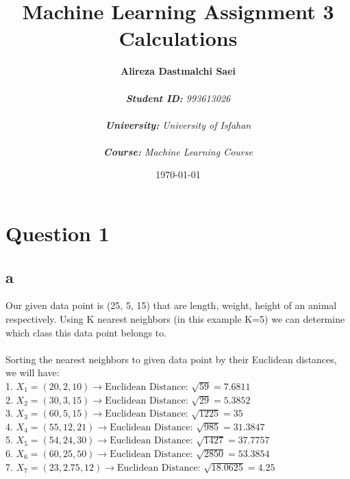 \documentclass{article}
\title{\textbf{Machine Learning Assignment 3 Calculations}}
\author{\textbf{Alireza Dastmalchi Saei}\\\\
    \textit{\textbf{Student ID:} 993613026}\\\\
    \textit{\textbf{University:} University of Isfahan}\\\\
    \textit{\textbf{Course:} Machine Learning Course}\\}
\date{\today}
\begin{document}
\posttitle{\end{center}\vspace{3\baselineskip}}

\maketitle
\pagebreak

\section{Question 1}

\subsection{a}
Our given data point is (25, 5, 15) that are length, weight, height of an animal respectively. Using K nearest neighbors (in this example K=5) we can determine which class this data point belongs to. \\\\
Sorting the nearest neighbors to given data point by their Euclidean distances, we will have:\\

1. $X_1 = (20, 2, 10) \rightarrow \text{Euclidean Distance: } \sqrt{59} = 7.6811 $  \\

2. $X_2 = (30, 3, 15) \rightarrow \text{Euclidean Distance: } \sqrt{29} = 5.3852 $ \\

3. $X_3 = (60, 5, 15) \rightarrow \text{Euclidean Distance: } \sqrt{1225} = 35 $ \\

4. $X_4 = (55, 12, 21) \rightarrow \text{Euclidean Distance: } \sqrt{985} = 31.3847 $ \\

5. $X_5 = (54, 24, 30) \rightarrow \text{Euclidean Distance: } \sqrt{1427} = 37.7757 $ \\

6. $X_6 = (60, 25, 50) \rightarrow \text{Euclidean Distance: } \sqrt{2850} = 53.3854 $ \\

7. $X_7 = (23, 2.75, 12) \rightarrow \text{Euclidean Distance: } \sqrt{18.0625} = 4.25 $ \\
\end{document}
